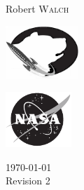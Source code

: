 \documentclass{article}
\begin{document}
\begin{titlepage}
\begin{center}
\begin{minipage}{0.4\textwidth}
\begin{flushright}
						Robert \textsc{Walch}\\
					\end{flushright}
				\end{minipage}
				\vfill
				\vspace{.75cm}
				\begin{minipage}{0.4\textwidth}
					\begin{flushleft} 
						\includegraphics[width=2.75cm]{UNC}\\
					\end{flushleft}
				\end{minipage}
				\begin{minipage}{0.4\textwidth}
					\begin{flushright}
						\includegraphics[width=2.5cm]{NASA}\\
					\end{flushright}
				\end{minipage}

			{\large \today}\\
			Revision 2
		\end{center}
	\end{titlepage}



\newpage
\tableofcontents	
\newpage


\end{document}
